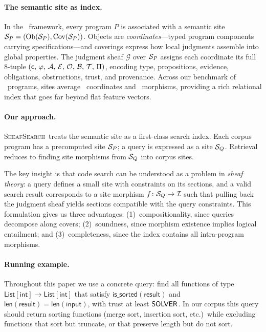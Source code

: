 \documentclass[11pt]{article}
\newcommand{\SemIndex}{\mathcal{I}}
\newcommand{\CodeSearch}{\textsc{SheafSearch}}
\begin{document}
\paragraph{The semantic site as index.}
In the \JuGeo\ framework, every program $P$ is associated with a
semantic site $\mathcal{S}_P = (\mathrm{Ob}(\mathcal{S}_P), \mathrm{Cov}(\mathcal{S}_P))$.  Objects are
\emph{coordinates}---typed program components carrying specifications---and
coverings express how local judgments assemble into global properties.
The judgment sheaf $\mathcal{G}$ over $\mathcal{S}_P$ assigns each coordinate
its full 8-tuple $(\mathsf{c},\,\varphi,\,\mathcal{A},\,\mathcal{E},\,\mathcal{O},\,\mathcal{B},\,\mathcal{T},\,\Pi)$,
encoding type, propositions, evidence, obligations, obstructions, trust,
and provenance.  Across our benchmark of \compTotalPrograms\ programs,
sites average \compSiteMeanCoords\ coordinates and
\compSiteMeanMorphisms\ morphisms, providing a rich relational index
that goes far beyond flat feature vectors.

\paragraph{Our approach.}
\CodeSearch\ treats the semantic site as a first-class search index.
Each corpus program has a precomputed site $\mathcal{S}_P$; a query is
expressed as a site $\mathcal{S}_Q$.  Retrieval reduces to finding site
morphisms from $\mathcal{S}_Q$ into corpus sites.

The key insight is that code search can be understood as a problem in
\emph{sheaf theory}: a query defines a small site with constraints on
its sections, and a valid search result corresponds to a site morphism
$f \colon \Site_Q \to \SemIndex$ such that pulling back the judgment
sheaf yields sections compatible with the query constraints.  This
formulation gives us three advantages: (1)~compositionality, since
queries decompose along covers; (2)~soundness, since morphism existence
implies logical entailment; and (3)~completeness, since the index
contains all intra-program morphisms.

\paragraph{Running example.}
Throughout this paper we use a concrete query: find all functions of type
$\mathsf{List}[\mathsf{int}] \to \mathsf{List}[\mathsf{int}]$ that
satisfy $\mathsf{is\_sorted}(\mathsf{result})$ and
$\mathsf{len}(\mathsf{result}) = \mathsf{len}(\mathsf{input})$, with
trust at least $\mathsf{SOLVER}$.  In our corpus this query should return
sorting functions (merge sort, insertion sort, etc.)\ while excluding
functions that sort but truncate, or that preserve length but do not sort.
\end{document}
